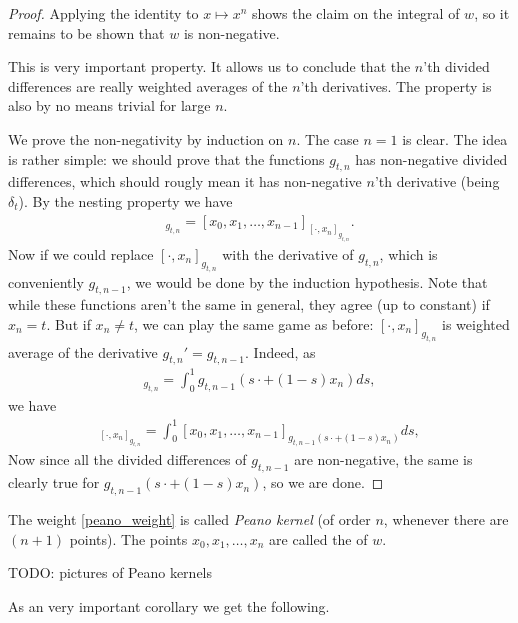\begin{proof}
	Applying the identity to $x \mapsto x^{n}$ shows the claim on the integral of $w$, so it remains to be shown that $w$ is non-negative.

	This is very important property. It allows us to conclude that the $n$'th divided differences are really weighted averages of the $n$'th derivatives. The property is also by no means trivial for large $n$.

	We prove the non-negativity by induction on $n$. The case $n = 1$ is clear. The idea is rather simple: we should prove that the functions $g_{t, n}$ has non-negative divided differences, which should rougly mean it has non-negative $n$'th derivative (being $\delta_{t}$). By the nesting property we have
	\begin{align*}
		[x_{0}, x_{1}, \ldots, x_{n}]_{g_{t, n}} = [x_{0}, x_{1}, \ldots, x_{n - 1}]_{[\cdot, x_{n}]_{g_{t, n}}}.
	\end{align*}
	Now if we could replace $[\cdot, x_{n}]_{g_{t, n}}$ with the derivative of $g_{t, n}$, which is conveniently $g_{t, n - 1}$, we would be done by the induction hypothesis. Note that while these functions aren't the same in general, they agree (up to constant) if $x_{n} = t$. But if $x_{n} \neq t$, we can play the same game as before: $[\cdot, x_{n}]_{g_{t, n}}$ is weighted average of the derivative $g_{t, n}' = g_{t, n - 1}$. Indeed, as
	\begin{align*}
		[\cdot, x_{n}]_{g_{t, n}} = \int_{0}^{1} g_{t, n - 1}(s \cdot + (1 - s) x_{n}) ds,
	\end{align*}
	we have
	\begin{align*}
		[x_{0}, x_{1}, \ldots, x_{n}]_{[\cdot, x_{n}]_{g_{t, n}}} = \int_{0}^{1} [x_{0}, x_{1}, \ldots, x_{n - 1}]_{g_{t, n - 1}(s \cdot + (1 - s) x_{n})} ds,
	\end{align*}
	Now since all the divided differences of $g_{t, n - 1}$ are non-negative, the same is clearly true for $g_{t, n - 1}(s \cdot + (1 - s) x_{n})$, so we are done.
\end{proof}

The weight \ref{peano_weight} is called \textit{Peano kernel} (of order $n$, whenever there are $(n + 1)$ points). The points $x_{0}, x_{1}, \ldots, x_{n}$ are called the  of $w$.

TODO: pictures of Peano kernels

As an very important corollary we get the following.

